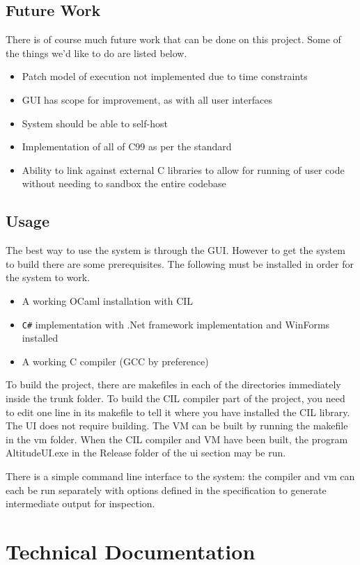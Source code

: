 \documentclass[10pt,a4paper]{report}
\begin{document}
\section{Future Work}
There is of course much future work that can be done on this project. Some of the things we'd like to do are listed below.
\begin{itemize}
\item Patch model of execution not implemented due to time constraints
\item GUI has scope for improvement, as with all user interfaces
\item System should be able to self-host
\item Implementation of all of C99 as per the standard
\item Ability to link against external C libraries to allow for running of user code without needing to sandbox the entire codebase
\end{itemize}

\section{Usage}
The best way to use the system is through the GUI. However to get the system to build there are some prerequisites. The following must be installed in order for the system to work.

\begin{itemize}
 \item A working OCaml installation with CIL
 \item \lstinline{C#} implementation with .Net framework implementation 
and WinForms installed
 \item A working C compiler (GCC by preference)
\end{itemize}

To build the project, there are makefiles in each of the directories 
immediately inside the trunk folder. To build the CIL compiler part of 
the project, you need to edit one line in its makefile to tell it where you have installed the CIL library. The UI does not require building. The VM can be built by running the makefile in the vm folder. When the CIL compiler and VM have been built, the program AltitudeUI.exe in the Release folder of the ui section may be run.

There is a simple command line interface to the system: the compiler and vm can each be run separately with options defined in the specification to generate intermediate output for inspection.
\chapter{Technical Documentation}
\end{document}
